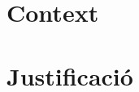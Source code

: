 \documentclass[]{article}
\title{}
\author{}
\begin{document}
\maketitle

\begin{abstract}

\end{abstract}

\section{Context}
\section{Justificació}
\end{document}
